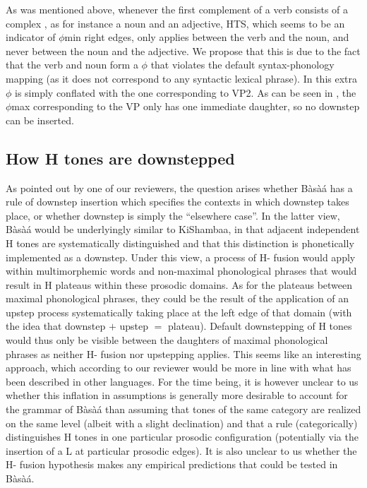 \documentclass[output=paper,newtxmath,modfonts,nonflat,hidelinks]{langsci/langscibook}
\begin{document}
\noindent As was mentioned above, whenever the first complement of a verb consists of a complex , as for instance a noun and an adjective, HTS, which seems to be an indicator of $\phi$min right edges, only applies between the verb and the noun, and never between the noun and the adjective. We propose that this is due to the fact that the verb and noun form a $\phi$ that violates the default syntax-phonology mapping (as it does not correspond to any syntactic lexical phrase). In  this extra $\phi$ is simply conflated with the one corresponding to VP2. As can be seen in , the $\phi$max corresponding to the VP only has one immediate daughter, so no downstep can be inserted.


\subsection{How H tones are downstepped}

As pointed out by one of our reviewers, the question arises whether Bàsà{á} has a rule of downstep insertion which specifies the contexts in which downstep takes place, or whether downstep is simply the ``elsewhere case''. In the latter view, Bàsà{á} would be underlyingly similar to KiShambaa, in that adjacent independent H tones are systematically distinguished and that this distinction is phonetically implemented as a downstep. Under this view, a process of H- fusion \citep{Odden82, Bickmore00} would apply within multimorphemic words and non-maximal phonological phrases that would result in H  plateaus within these prosodic domains. As for the plateaus between maximal phonological phrases, they could be the result of the application of an upstep process systematically taking place at the left edge of that domain (with the idea that downstep $+$ upstep $=$ plateau). Default downstepping of H tones would thus only be visible between the daughters of maximal phonological phrases as neither H- fusion nor upstepping applies. This seems like an interesting approach, which according to our reviewer would be more in line with what has been described in other  languages. For the time being, it is however unclear to us whether this inflation in assumptions is generally more desirable to account for the grammar of Bàsà{á} than assuming that  tones of the same category are realized on the same level (albeit with a slight declination) and that a rule (categorically) distinguishes H tones in one particular prosodic configuration (potentially via the insertion of a L  at particular prosodic edges). It is also unclear to us whether the H- fusion hypothesis makes any empirical predictions that could be tested in Bàsà{á}.
\end{document}
